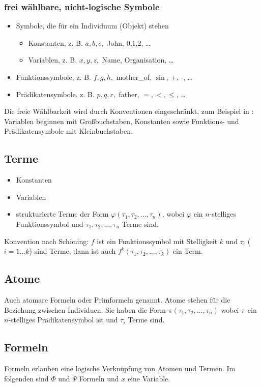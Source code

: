 \documentclass[a4paper,twoside,DIV15,BCOR12mm]{scrbook}
\begin{document}
\subsubsection{frei wählbare, nicht-logische Symbole}
\begin{itemize}
\item Symbole, die für ein Individuum (Objekt) stehen
  \begin{itemize}
  \item Konstanten, z. B. $a, b, c,$ John, 0,1,2, \ldots
  \item Variablen, z. B. $x, y, z,$ Name, Organisation, \ldots
 \end{itemize}
\item Funktionssymbole, z. B. $f, g, h,$ mother\_of, $\sin$, +, -, \ldots
\item Prädikatensymbole, z. B. $p, q, r,$ father, $=, <, \le$, \ldots
\end{itemize}

Die freie Wählbarkeit wird durch Konventionen eingeschränkt, zum Beispiel in : Variablen beginnen mit Großbuchstaben, Konstanten sowie Funktions- und Prädikatensymbole mit Kleinbuchstaben.

\subsection{Terme}
\begin{itemize}
\item Konstanten
\item Variablen
\item strukturierte Terme der Form $\varphi(\tau_1,\tau_2,\ldots,\tau_n)$, wobei $\varphi$ ein $n$-stelliges Funktionssymbol und $\tau_1,\tau_2,\ldots,\tau_n$ Terme sind.
\end{itemize}

Konvention nach Schöning: $f$ ist ein Funktionssymbol mit Stelligkeit $k$ und $\tau_i$ ($i=1\ldots k$) sind Terme, dann ist auch $f^k(\tau_1,\tau_2,\ldots,\tau_k)$ ein Term.

\subsection{Atome}
Auch atomare Formeln oder Primformeln genannt. Atome stehen für die Beziehung zwischen Individuen. Sie haben die Form $\pi(\tau_1,\tau_2,\ldots,\tau_n)$ wobei $\pi$ ein $n$-stelliges Prädikatensymbol ist und $\tau_i$ Terme sind.

\subsection{Formeln}
Formeln erlauben eine logische Verknüpfung von Atomen und Termen. Im folgenden sind $\Phi$ und $\Psi$ Formeln und $x$ eine Variable.
\end{document}
